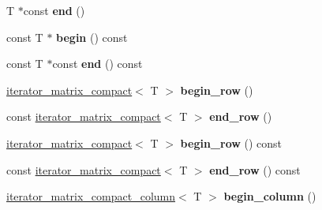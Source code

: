 \begin{DoxyCompactItemize}
\item 
T $\ast$const {\bfseries end} ()\hypertarget{classmalgo_1_1matrix__compact__basic_a6f58796eddf07ab0aa8fc2aae7260c0e}{}\label{classmalgo_1_1matrix__compact__basic_a6f58796eddf07ab0aa8fc2aae7260c0e}

\item 
const T $\ast$ {\bfseries begin} () const \hypertarget{classmalgo_1_1matrix__compact__basic_ae98e2573cbd91b479a0faa2078cc8e9a}{}\label{classmalgo_1_1matrix__compact__basic_ae98e2573cbd91b479a0faa2078cc8e9a}

\item 
const T $\ast$const {\bfseries end} () const \hypertarget{classmalgo_1_1matrix__compact__basic_a3f334946eb3a6df4c404a43df26ef76f}{}\label{classmalgo_1_1matrix__compact__basic_a3f334946eb3a6df4c404a43df26ef76f}

\item 
\hyperlink{structmalgo_1_1iterator__matrix__compact}{iterator\+\_\+matrix\+\_\+compact}$<$ T $>$ {\bfseries begin\+\_\+row} ()\hypertarget{classmalgo_1_1matrix__compact__basic_ace7e722afb4383d6b6187a9946b4bc3f}{}\label{classmalgo_1_1matrix__compact__basic_ace7e722afb4383d6b6187a9946b4bc3f}

\item 
const \hyperlink{structmalgo_1_1iterator__matrix__compact}{iterator\+\_\+matrix\+\_\+compact}$<$ T $>$ {\bfseries end\+\_\+row} ()\hypertarget{classmalgo_1_1matrix__compact__basic_a3596210ca2966369b87d58cb3a4a2da7}{}\label{classmalgo_1_1matrix__compact__basic_a3596210ca2966369b87d58cb3a4a2da7}

\item 
\hyperlink{structmalgo_1_1iterator__matrix__compact}{iterator\+\_\+matrix\+\_\+compact}$<$ T $>$ {\bfseries begin\+\_\+row} () const \hypertarget{classmalgo_1_1matrix__compact__basic_a1b37a138823b284da07d771c7deee719}{}\label{classmalgo_1_1matrix__compact__basic_a1b37a138823b284da07d771c7deee719}

\item 
const \hyperlink{structmalgo_1_1iterator__matrix__compact}{iterator\+\_\+matrix\+\_\+compact}$<$ T $>$ {\bfseries end\+\_\+row} () const \hypertarget{classmalgo_1_1matrix__compact__basic_a5a461cf79f97d534591ec88a36b34e47}{}\label{classmalgo_1_1matrix__compact__basic_a5a461cf79f97d534591ec88a36b34e47}

\item 
\hyperlink{structmalgo_1_1iterator__matrix__compact__column}{iterator\+\_\+matrix\+\_\+compact\+\_\+column}$<$ T $>$ {\bfseries begin\+\_\+column} ()\hypertarget{classmalgo_1_1matrix__compact__basic_a641773645a797fe5a376df4522614e0c}{}\label{classmalgo_1_1matrix__compact__basic_a641773645a797fe5a376df4522614e0c}


\end{DoxyCompactItemize}
